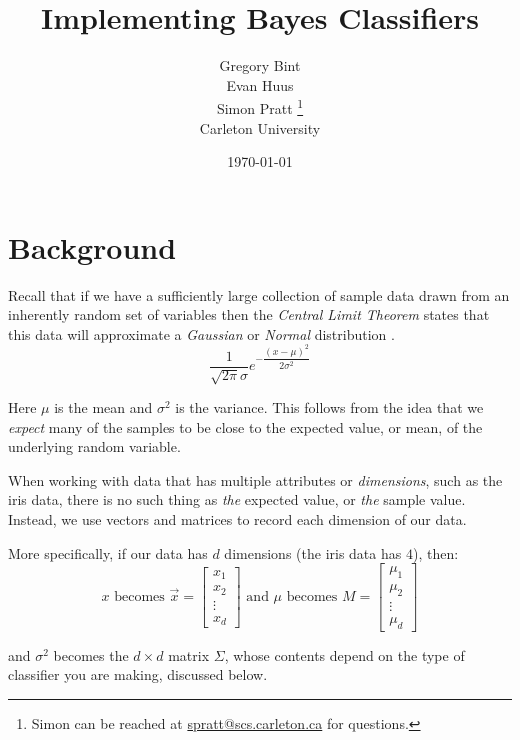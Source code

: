 \documentclass{article}
\title{Implementing Bayes Classifiers}
\author{Gregory Bint \\
  Evan Huus \\
  Simon Pratt
  \footnote{Simon can be reached at
    \href{mailto:spratt@scs.carleton.ca}{spratt@scs.carleton.ca} for questions.} \\
  {\small Carleton University}}
\date{\today}
\begin{document}
\maketitle


\section{Background}
\label{sec:Background}

Recall that if we have a sufficiently large collection of sample data
drawn from an inherently random set of variables then the
\emph{Central Limit Theorem} \cite{wiki_clt} states that this data
will approximate a \emph{Gaussian} or \emph{Normal} distribution
\cite{wiki_normal_dist}.
\begin{equation}
\label{e_sv_gauss}
\dfrac{1}{\sqrt{2\pi}\sigma}e^{-\dfrac{(x-\mu)^2}{2\sigma^2}}
\end{equation}

Here $\mu$ is the mean and $\sigma^2$ is the variance. This follows
from the idea that we \emph{expect} many of the samples to be close to
the expected value, or mean, of the underlying random variable.

When working with data that has multiple attributes or
\emph{dimensions}, such as the iris data, there is no such thing as
\emph{the} expected value, or \emph{the} sample value. Instead, we use
vectors and matrices to record each dimension of our data.

More specifically, if our data has $d$ dimensions (the iris data has
$4$), then:
\[ 
x \text{ becomes } \vec{x} = 
\begin{bmatrix} x_1 \\ x_2 \\ \vdots \\ x_d \end{bmatrix}
\text { and } 
\mu \text{ becomes } M = 
\begin{bmatrix} \mu_1 \\ \mu_2 \\ \vdots \\ \mu_d \end{bmatrix}
\]

and $\sigma^2$ becomes the $d \times d$ matrix $\Sigma$, whose
contents depend on the type of classifier you are making, discussed
below.
\end{document}
